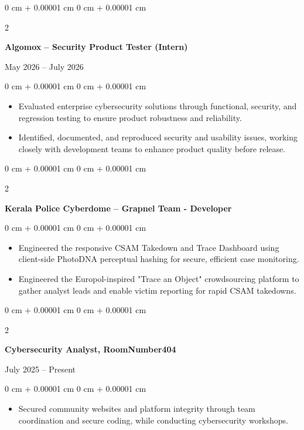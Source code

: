 \documentclass[10pt, a4paper]{article}
\newenvironment{highlights}{
    \begin{itemize}[
        topsep=0.10 cm,
        parsep=0.10 cm,
        partopsep=0pt,
        itemsep=0pt,
        leftmargin=0 cm + 10pt
    ]
}{
    \end{itemize}
} %
\newenvironment{onecolentry}{
    \begin{adjustwidth}{
        0 cm + 0.00001 cm
    }{
        0 cm + 0.00001 cm
    }
}{
    \end{adjustwidth}
} %
\newenvironment{twocolentry}[2][]{
    \onecolentry
    \def\secondColumn{#2}
    \setcolumnwidth{\fill, 4.5 cm}
    \begin{paracol}{2}
}{
    \switchcolumn \raggedleft \secondColumn
    \end{paracol}
    \endonecolentry
} %
\begin{document}
    \vspace{0.2 cm}

\begin{twocolentry}{
    May 2026 – July 2026
}
    \textbf{Algomox – Security Product Tester (Intern)}
\end{twocolentry}

\vspace{0.10 cm}
\begin{onecolentry}
    \begin{highlights}
        \item Evaluated enterprise cybersecurity solutions through functional, security, and regression testing to ensure product robustness and reliability.
        \item Identified, documented, and reproduced security and usability issues, working closely with development teams to enhance product quality before release.
    \end{highlights}
\end{onecolentry}

\vspace{0.2 cm}

\begin{twocolentry}{
}
    \textbf{Kerala Police Cyberdome – Grapnel Team - Developer}
\end{twocolentry}

\vspace{0.10 cm}
\begin{onecolentry}
    \begin{highlights}
        \item Engineered the responsive CSAM Takedown and Trace Dashboard using client-side PhotoDNA perceptual hashing for secure, efficient case monitoring.
        \item Engineered the Europol-inspired "Trace an Object" crowdsourcing platform to gather analyst leads and enable victim reporting for rapid CSAM takedowns.
    \end{highlights}
\end{onecolentry}

    \vspace{0.2 cm}

\begin{twocolentry}{
    July 2025 – Present
}
    \textbf{Cybersecurity Analyst, RoomNumber404}
\end{twocolentry}

\vspace{0.10 cm}
\begin{onecolentry}
    \begin{highlights}
        \item Secured community websites and platform integrity through team coordination and secure coding, while conducting cybersecurity workshops.
    \end{highlights}
\end{onecolentry}
\end{document}

